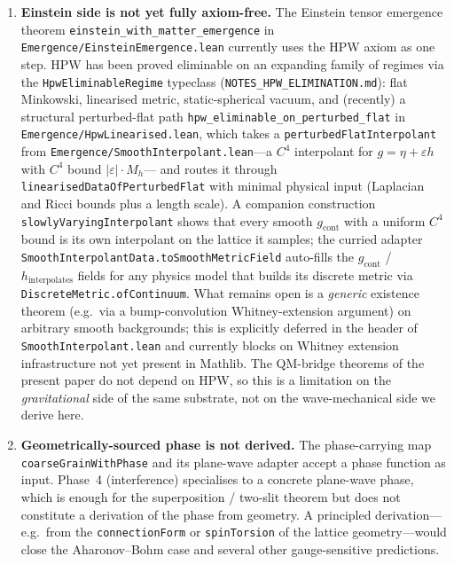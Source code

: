 \documentclass[11pt,a4paper,twoside]{article}
\theoremstyle{definition}
\newcommand{\code}[1]{\texttt{#1}}
\begin{document}
\begin{enumerate}
\item \textbf{Einstein side is not yet fully axiom-free.} The
  Einstein tensor emergence theorem
  \code{einstein\_with\_matter\_emergence} in
  \code{Emergence/EinsteinEmergence.lean} currently uses the HPW axiom
  as one step. HPW has been proved eliminable on an expanding family
  of regimes via the \code{HpwEliminableRegime} typeclass
  (\code{NOTES\_HPW\_ELIMINATION.md}): flat Minkowski, linearised
  metric, static-spherical vacuum, and (recently) a structural
  perturbed-flat path
  \code{hpw\_eliminable\_on\_perturbed\_flat} in
  \code{Emergence/HpwLinearised.lean}, which takes a
  \code{perturbedFlatInterpolant} from
  \code{Emergence/SmoothInterpolant.lean}---a $C^{4}$ interpolant for
  $g = \eta + \varepsilon h$ with $C^{4}$ bound $|\varepsilon|\cdot M_{h}$---
  and routes it through \code{linearisedDataOfPerturbedFlat} with
  minimal physical input (Laplacian and Ricci bounds plus a length
  scale). A companion construction \code{slowlyVaryingInterpolant}
  shows that every smooth $g_{\mathrm{cont}}$ with a uniform $C^{4}$
  bound is its own interpolant on the lattice it samples; the
  curried adapter \code{SmoothInterpolantData.toSmoothMetricField}
  auto-fills the $g_{\mathrm{cont}}$ / $h_{\mathrm{interpolates}}$
  fields for any physics model that builds its discrete metric via
  \code{DiscreteMetric.ofContinuum}. What remains open is a
  \emph{generic} existence theorem (e.g.\ via a bump-convolution
  Whitney-extension argument) on arbitrary smooth backgrounds; this
  is explicitly deferred in the header of
  \code{SmoothInterpolant.lean} and currently blocks on Whitney
  extension infrastructure not yet present in Mathlib. The QM-bridge
  theorems of the present paper do not depend on HPW, so this is a
  limitation on the \emph{gravitational} side of the same substrate,
  not on the wave-mechanical side we derive here.

\item \textbf{Geometrically-sourced phase is not derived.} The
  phase-carrying map \code{coarseGrainWithPhase} and its plane-wave
  adapter accept a phase function as input. Phase~4 (interference)
  specialises to a concrete plane-wave phase, which is enough for the
  superposition / two-slit theorem but does not constitute a
  derivation of the phase from geometry. A principled derivation---
  e.g.\ from the \code{connectionForm} or \code{spinTorsion} of the
  lattice geometry---would close the Aharonov--Bohm case and several
  other gauge-sensitive predictions.


\end{enumerate}
\end{document}
